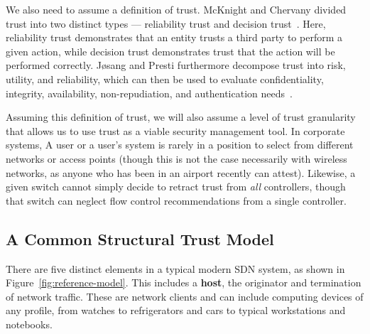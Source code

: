 \documentclass[10pt,conference]{IEEEtran}
\begin{document}
We also need to assume a definition of trust.  McKnight and Chervany divided trust into two distinct types --- reliability trust and decision trust~\cite{McCh:96}.  Here, reliability trust demonstrates that an entity trusts a third party to perform a given action, while decision trust demonstrates trust that the action will be performed correctly.  J{\o}sang and Presti furthermore decompose trust into risk, utility, and reliability, which can then be used to evaluate confidentiality, integrity, availability, non-repudiation, and authentication needs~\cite{JoPr:04,Wi:93}.

Assuming this definition of trust, we will also assume a level of trust granularity that allows us to use trust as a viable security management tool.  In corporate systems, A user or a user's system is rarely in a position to select from different networks or access points (though this is not the case necessarily with wireless networks, as anyone who has been in an airport recently can attest).  Likewise, a given switch cannot simply decide to retract trust from {\sl all} controllers, though that switch can neglect flow control recommendations from a single controller.

\subsection{A Common Structural Trust Model}
There are five distinct elements in a typical modern SDN system, as shown in Figure~\ref{fig:reference-model}.  This includes a {\bf host}, the originator and termination of network traffic.  These are network clients and can include computing devices of any profile, from watches to refrigerators and cars to typical workstations and notebooks.
\end{document}
